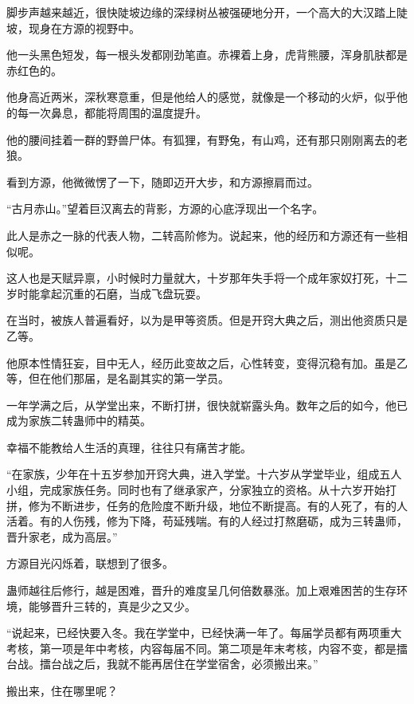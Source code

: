 
\begin{this_body}

脚步声越来越近，很快陡坡边缘的深绿树丛被强硬地分开，一个高大的大汉踏上陡坡，现身在方源的视野中。

他一头黑色短发，每一根头发都刚劲笔直。赤裸着上身，虎背熊腰，浑身肌肤都是赤红色的。

他身高近两米，深秋寒意重，但是他给人的感觉，就像是一个移动的火炉，似乎他的每一次鼻息，都能将周围的温度提升。

他的腰间挂着一群的野兽尸体。有狐狸，有野兔，有山鸡，还有那只刚刚离去的老狼。

看到方源，他微微愣了一下，随即迈开大步，和方源擦肩而过。

“古月赤山。”望着巨汉离去的背影，方源的心底浮现出一个名字。

此人是赤之一脉的代表人物，二转高阶修为。说起来，他的经历和方源还有一些相似呢。

这人也是天赋异禀，小时候时力量就大，十岁那年失手将一个成年家奴打死，十二岁时能拿起沉重的石磨，当成飞盘玩耍。

在当时，被族人普遍看好，以为是甲等资质。但是开窍大典之后，测出他资质只是乙等。

他原本性情狂妄，目中无人，经历此变故之后，心性转变，变得沉稳有加。虽是乙等，但在他们那届，是名副其实的第一学员。

一年学满之后，从学堂出来，不断打拼，很快就崭露头角。数年之后的如今，他已成为家族二转蛊师中的精英。

幸福不能教给人生活的真理，往往只有痛苦才能。

“在家族，少年在十五岁参加开窍大典，进入学堂。十六岁从学堂毕业，组成五人小组，完成家族任务。同时也有了继承家产，分家独立的资格。从十六岁开始打拼，修为不断进步，任务的危险度不断升级，地位不断提高。有的人死了，有的人活着。有的人伤残，修为下降，苟延残喘。有的人经过打熬磨砺，成为三转蛊师，晋升家老，成为高层。”

方源目光闪烁着，联想到了很多。

蛊师越往后修行，越是困难，晋升的难度呈几何倍数暴涨。加上艰难困苦的生存环境，能够晋升三转的，真是少之又少。

“说起来，已经快要入冬。我在学堂中，已经快满一年了。每届学员都有两项重大考核，第一项是年中考核，内容每届不同。第二项是年末考核，内容不变，都是擂台战。擂台战之后，我就不能再居住在学堂宿舍，必须搬出来。”

搬出来，住在哪里呢？


\end{this_body}
